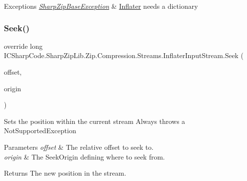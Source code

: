 \begin{DoxyExceptions}{Exceptions}
{\em \hyperlink{class_i_c_sharp_code_1_1_sharp_zip_lib_1_1_sharp_zip_base_exception}{Sharp\+Zip\+Base\+Exception}} & \hyperlink{class_i_c_sharp_code_1_1_sharp_zip_lib_1_1_zip_1_1_compression_1_1_inflater}{Inflater} needs a dictionary \\
\hline
\end{DoxyExceptions}
\mbox{\label{class_i_c_sharp_code_1_1_sharp_zip_lib_1_1_zip_1_1_compression_1_1_streams_1_1_inflater_input_stream_ade431915c314b6f8fb4c08f6f55ce14d}} 
\subsubsection{\texorpdfstring{Seek()}{Seek()}\hspace{0.1cm}{\footnotesize\ttfamily [1/2]}}
{\footnotesize\ttfamily override long I\+C\+Sharp\+Code.\+Sharp\+Zip\+Lib.\+Zip.\+Compression.\+Streams.\+Inflater\+Input\+Stream.\+Seek (\begin{DoxyParamCaption}\item[{long}]{offset,  }\item[{Seek\+Origin}]{origin }\end{DoxyParamCaption})\hspace{0.3cm}{\ttfamily [inline]}}



Sets the position within the current stream Always throws a Not\+Supported\+Exception 


\begin{DoxyParams}{Parameters}
{\em offset} & The relative offset to seek to.\\
\hline
{\em origin} & The Seek\+Origin defining where to seek from.\\
\hline
\end{DoxyParams}
\begin{DoxyReturn}{Returns}
The new position in the stream.
\end{DoxyReturn}

